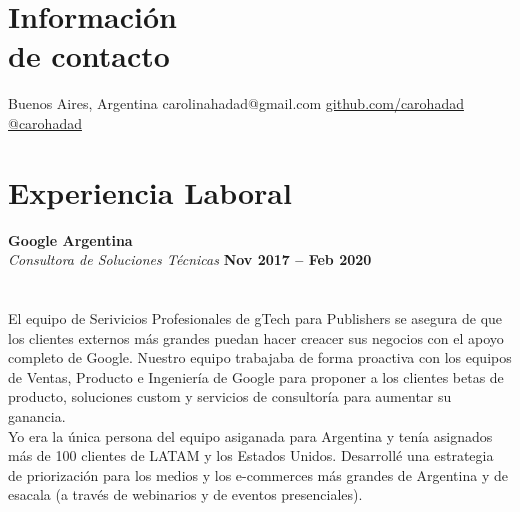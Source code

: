 \documentclass[margin,line]{resume}
\begin{document}
\begin{resume}

\section{\mysidestyle Informaci\'on \\de contacto}

\faMapMarker \vspace{5mm} Buenos Aires, Argentina \hfill
\faEnvelope \vspace{5mm} carolinahadad@gmail.com
\faGithub \vspace{5mm} \href{https://github.com/carohadad}{github.com/carohadad} \hfill
\faTwitter \vspace{5mm} \href{https://twitter.com/carohadad}{@carohadad}

\vspace{-1.5cm}
\section{\mysidestyle Experiencia Laboral}


\textbf{Google Argentina}\vspace{2mm}\\\vspace{1mm}
\textsl{Consultora de Soluciones T\'ecnicas} 
 \hfill \textbf{Nov 2017 -- Feb 2020}\vspace{-3mm}\\\vspace{-1mm}
\hfill \vspace{-3mm}\\\vspace{-1mm}
\\
El equipo de Serivicios Profesionales de gTech para Publishers se asegura de que los clientes externos más grandes puedan hacer creacer sus negocios con el apoyo completo de Google.  Nuestro equipo trabajaba de forma proactiva con los equipos de Ventas, Producto e Ingenier\'ia de Google para proponer a los clientes betas de producto, soluciones custom y servicios de consultor\'ia para aumentar su ganancia.
\\
Yo era la \'unica persona del equipo asiganada para Argentina y ten\'ia asignados más de 100 clientes de LATAM y los Estados Unidos. Desarroll\'e una estrategia de priorizaci\'on para los medios y los e-commerces más grandes de Argentina y de esacala (a trav\'es de webinarios y de eventos presenciales).


\end{resume}
\end{document}
